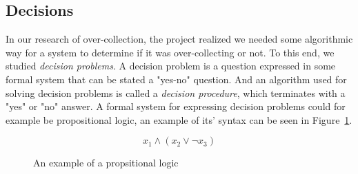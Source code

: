 









\subsection{Decisions}









In our research of over-collection, the project realized we needed some algorithmic way for a system to determine if it was over-collecting or not. To this end, we studied \textit{decision problems}. A decision problem is a question expressed in some formal system that can be stated a "yes-no" question. And an algorithm used for solving decision problems is called a \textit{decision procedure}, which terminates with a "yes" or "no" answer\cite{decisionproceduresbook}. A formal system for expressing decision problems could for example be propositional logic, an example of its' syntax can be seen in Figure~\ref{fig:prop_logic}. 

\begin{figure}[ht]
	\[ x_1 \land (x_2 \lor \neg x_3) \]
    \caption{An example of a propsitional logic}
    \label{fig:prop_logic}
\end{figure}



